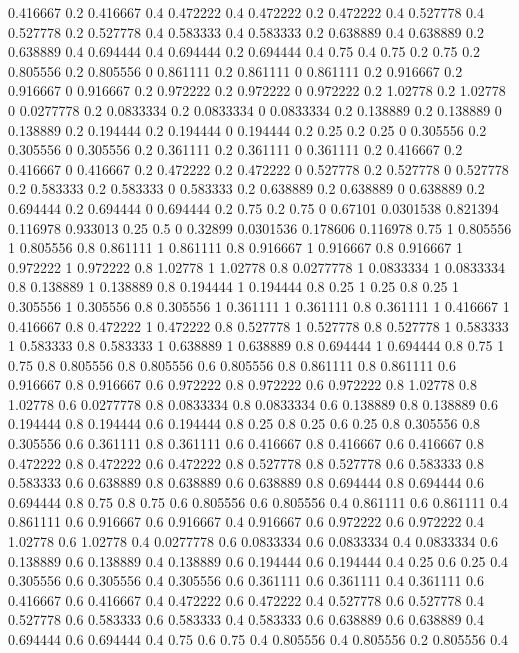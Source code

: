 0.416667 0.2
0.416667 0.4
0.472222 0.4
0.472222 0.2
0.472222 0.4
0.527778 0.4
0.527778 0.2
0.527778 0.4
0.583333 0.4
0.583333 0.2
0.638889 0.4
0.638889 0.2
0.638889 0.4
0.694444 0.4
0.694444 0.2
0.694444 0.4
0.75 0.4
0.75 0.2
0.75 0.2
0.805556 0.2
0.805556 0
0.861111 0.2
0.861111 0
0.861111 0.2
0.916667 0.2
0.916667 0
0.916667 0.2
0.972222 0.2
0.972222 0
0.972222 0.2
1.02778 0.2
1.02778 0
0.0277778 0.2
0.0833334 0.2
0.0833334 0
0.0833334 0.2
0.138889 0.2
0.138889 0
0.138889 0.2
0.194444 0.2
0.194444 0
0.194444 0.2
0.25 0.2
0.25 0
0.305556 0.2
0.305556 0
0.305556 0.2
0.361111 0.2
0.361111 0
0.361111 0.2
0.416667 0.2
0.416667 0
0.416667 0.2
0.472222 0.2
0.472222 0
0.527778 0.2
0.527778 0
0.527778 0.2
0.583333 0.2
0.583333 0
0.583333 0.2
0.638889 0.2
0.638889 0
0.638889 0.2
0.694444 0.2
0.694444 0
0.694444 0.2
0.75 0.2
0.75 0
0.67101 0.0301538
0.821394 0.116978
0.933013 0.25
0.5 0
0.32899 0.0301536
0.178606 0.116978
0.75 1
0.805556 1
0.805556 0.8
0.861111 1
0.861111 0.8
0.916667 1
0.916667 0.8
0.916667 1
0.972222 1
0.972222 0.8
1.02778 1
1.02778 0.8
0.0277778 1
0.0833334 1
0.0833334 0.8
0.138889 1
0.138889 0.8
0.194444 1
0.194444 0.8
0.25 1
0.25 0.8
0.25 1
0.305556 1
0.305556 0.8
0.305556 1
0.361111 1
0.361111 0.8
0.361111 1
0.416667 1
0.416667 0.8
0.472222 1
0.472222 0.8
0.527778 1
0.527778 0.8
0.527778 1
0.583333 1
0.583333 0.8
0.583333 1
0.638889 1
0.638889 0.8
0.694444 1
0.694444 0.8
0.75 1
0.75 0.8
0.805556 0.8
0.805556 0.6
0.805556 0.8
0.861111 0.8
0.861111 0.6
0.916667 0.8
0.916667 0.6
0.972222 0.8
0.972222 0.6
0.972222 0.8
1.02778 0.8
1.02778 0.6
0.0277778 0.8
0.0833334 0.8
0.0833334 0.6
0.138889 0.8
0.138889 0.6
0.194444 0.8
0.194444 0.6
0.194444 0.8
0.25 0.8
0.25 0.6
0.25 0.8
0.305556 0.8
0.305556 0.6
0.361111 0.8
0.361111 0.6
0.416667 0.8
0.416667 0.6
0.416667 0.8
0.472222 0.8
0.472222 0.6
0.472222 0.8
0.527778 0.8
0.527778 0.6
0.583333 0.8
0.583333 0.6
0.638889 0.8
0.638889 0.6
0.638889 0.8
0.694444 0.8
0.694444 0.6
0.694444 0.8
0.75 0.8
0.75 0.6
0.805556 0.6
0.805556 0.4
0.861111 0.6
0.861111 0.4
0.861111 0.6
0.916667 0.6
0.916667 0.4
0.916667 0.6
0.972222 0.6
0.972222 0.4
1.02778 0.6
1.02778 0.4
0.0277778 0.6
0.0833334 0.6
0.0833334 0.4
0.0833334 0.6
0.138889 0.6
0.138889 0.4
0.138889 0.6
0.194444 0.6
0.194444 0.4
0.25 0.6
0.25 0.4
0.305556 0.6
0.305556 0.4
0.305556 0.6
0.361111 0.6
0.361111 0.4
0.361111 0.6
0.416667 0.6
0.416667 0.4
0.472222 0.6
0.472222 0.4
0.527778 0.6
0.527778 0.4
0.527778 0.6
0.583333 0.6
0.583333 0.4
0.583333 0.6
0.638889 0.6
0.638889 0.4
0.694444 0.6
0.694444 0.4
0.75 0.6
0.75 0.4
0.805556 0.4
0.805556 0.2
0.805556 0.4
